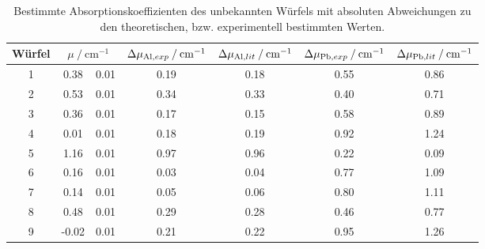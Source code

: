 \begin{table}
\centering
\caption{Bestimmte Absorptionskoeffizienten des unbekannten Würfels mit absoluten Abweichungen zu den theoretischen, bzw. experimentell bestimmten Werten.}
\label{tab: delta_mu}
\begin{tabular}{S S[table-format=1.2]@{${}\pm{}$} S[table-format=1.2] S S S S }
\toprule
{Würfel} &  & {$\Delta\mu_{\ce{Al}, exp} \:/\: \si{\centi\meter^{-1}}$} & {$\Delta\mu_{\ce{Al}, lit} \:/\: \si{\centi\meter^{-1}}$} & {$\Delta\mu_{\ce{Pb}, exp} \:/\: \si{\centi\meter^{-1}}$} & {$\Delta\mu_{\ce{Pb}, lit} \:/\: \si{\centi\meter^{-1}}$} \\
 & 0.38 & 0.01 & 0.19 & 0.18 & 0.55 & 0.86\\
2 & 0.53 & 0.01 & 0.34 & 0.33 & 0.40 & 0.71\\
3 & 0.36 & 0.01 & 0.17 & 0.15 & 0.58 & 0.89\\
4 & 0.01 & 0.01 & 0.18 & 0.19 & 0.92 & 1.24\\
5 & 1.16 & 0.01 & 0.97 & 0.96 & 0.22 & 0.09\\
6 & 0.16 & 0.01 & 0.03 & 0.04 & 0.77 & 1.09\\
7 & 0.14 & 0.01 & 0.05 & 0.06 & 0.80 & 1.11\\
8 & 0.48 & 0.01 & 0.29 & 0.28 & 0.46 & 0.77\\
9 & -0.02 & 0.01 & 0.21 & 0.22 & 0.95 & 1.26\\
\bottomrule
\end{tabular}
\end{table}
